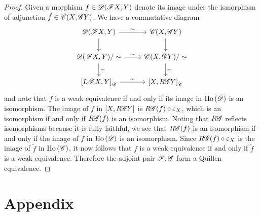\documentclass[10pt]{amsart}
\begin{document}
\begin{prop}
\begin{proof}
    Given a morphism $f \in \mathscr{D}(\mathscr{F} X, Y)$ denote its image under the ismorphism of adjunction $\tilde{f} \in \mathscr{C}(X, \mathscr{G} Y)$.
    We have a commutative diagram
    $$\begin{tikzcd}
      \D(\F X, Y) \arrow{r}{\sim}\arrow{d} & \C(X, \G Y)\arrow{d}\\
      \D(\F X, Y)/\sim \arrow{r}{\sim}\arrow[rotate=90,yshift=-.05ex]{d}{\sim} & \C(X, \G Y)/\sim\arrow[rotate=90,yshift=-.05ex]{d}{\sim}\\
      \left[L\F X, Y\right]_\D \arrow{r}{\sim} & \left[X, R\G Y\right]_\C
    \end{tikzcd}$$
    and note that $f$ is a weak equivalence if and only if its image in $\operatorname{Ho}\left(\mathscr{D}\right)$ is an isomorphism.
    The image of $f$ in $[X, R\mathscr{G} Y]$ is $R\mathscr{G}(f) \circ \varepsilon_X$, which is an isomorphism if and only if $R\mathscr{G}(f)$ is an isomorphism.
    Noting that $R \mathscr{G}$ reflects isomorphisms because it is fully faithful, we see that $R\mathscr{G}(f)$ is an isomorphism if and only if the image of $f$ in $\operatorname{Ho}\left(\mathscr{D}\right)$ is an isomorphism.
    Since $R \mathscr{G}(f) \circ \varepsilon_X$ is the image of $\tilde{f}$ in $\operatorname{Ho}\left(\mathscr{C}\right)$, it now follows that $f$ is a weak equivalence if and only if $\tilde{f}$ is a weak equivalence. 
    Therefore the adjoint pair $\mathscr{F},\mathscr{G}$ form a Quillen equivalence.
  \end{proof}
\end{prop}

\section{Appendix}
\end{document}
